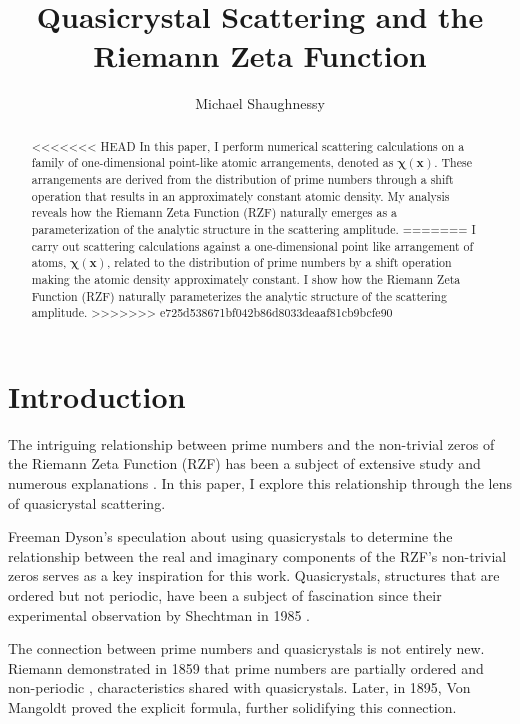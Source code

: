 \documentclass[11pt, oneside]{article}
\title{Quasicrystal Scattering and the Riemann Zeta Function}
\author{Michael Shaughnessy}
\begin{document}
\maketitle

\begin{abstract}
<<<<<<< HEAD
In this paper, I perform numerical scattering calculations on a family of one-dimensional point-like atomic arrangements, denoted as $\mathbf{\chi(x)}$. These arrangements are derived from the distribution of prime numbers through a shift operation that results in an approximately constant atomic density. My analysis reveals how the Riemann Zeta Function (RZF) naturally emerges as a parameterization of the analytic structure in the scattering amplitude.
=======
I carry out scattering calculations against a one-dimensional point like arrangement of atoms, $\mathbf{\chi(x)}$, related to the distribution of prime numbers by a shift operation making the atomic density approximately constant. 
I show how the Riemann Zeta Function (RZF) naturally parameterizes the analytic structure of the scattering amplitude. 
>>>>>>> e725d538671bf042b86d8033deaaf81cb9bcfe90
\end{abstract}

\section{Introduction}

The intriguing relationship between prime numbers and the non-trivial zeros of the Riemann Zeta Function (RZF) has been a subject of extensive study and numerous explanations \cite{Riemann, Selberg, Dyson, Zhang}. In this paper, I explore this relationship through the lens of quasicrystal scattering.

Freeman Dyson's speculation \cite{Baez} about using quasicrystals to determine the relationship between the real and imaginary components of the RZF's non-trivial zeros serves as a key inspiration for this work. Quasicrystals, structures that are ordered but not periodic, have been a subject of fascination since their experimental observation by Shechtman in 1985 \cite{Shechtman1985}.

The connection between prime numbers and quasicrystals is not entirely new. Riemann demonstrated in 1859 that prime numbers are partially ordered and non-periodic \cite{Riemann1859}, characteristics shared with quasicrystals. Later, in 1895, Von Mangoldt \cite{VonMangoldt1895} proved the explicit formula, further solidifying this connection.
\end{document}
